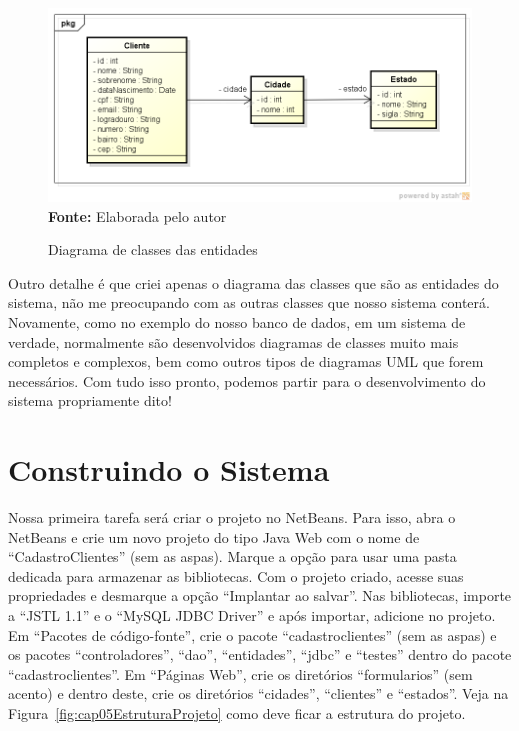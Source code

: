 \FloatBarrier
\begin{figure}[!htbp]
    \centering
    \caption{Diagrama de classes das entidades}
    \includegraphics[scale=0.6]{imagens/cap05DiagramaClasses}
    \\\textbf{Fonte:} Elaborada pelo autor
    \label{fig:cap05DiagramaClasses}
\end{figure}
\FloatBarrier

Outro detalhe é que criei apenas o diagrama das classes que são as entidades do sistema, não me preocupando com as outras classes que nosso sistema conterá. Novamente, como no exemplo do nosso banco de dados, em um sistema de verdade, normalmente são desenvolvidos diagramas de classes muito mais completos e complexos, bem como outros tipos de diagramas UML que forem necessários. Com tudo isso pronto, podemos partir para o desenvolvimento do sistema propriamente dito!


\section{Construindo o Sistema}


Nossa primeira tarefa será criar o projeto no NetBeans. Para isso, abra o NetBeans e crie um novo projeto do tipo Java Web com o nome de ``CadastroClientes'' (sem as aspas). Marque a opção para usar uma pasta dedicada para armazenar as bibliotecas. Com o projeto criado, acesse suas propriedades e desmarque a opção ``Implantar ao salvar''. Nas bibliotecas, importe a ``JSTL 1.1'' e o ``MySQL JDBC Driver'' e após importar, adicione no projeto.
Em ``Pacotes de código-fonte'', crie o pacote ``cadastroclientes'' (sem as aspas) e os pacotes ``controladores'', ``dao'', ``entidades'', ``jdbc'' e ``testes'' dentro do pacote ``cadastroclientes''. Em ``Páginas Web'', crie os diretórios ``formularios'' (sem acento) e dentro deste, crie os diretórios ``cidades'', ``clientes'' e ``estados''. Veja na Figura~\ref{fig:cap05EstruturaProjeto} como deve ficar a estrutura do projeto.


